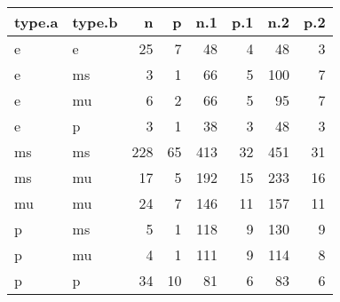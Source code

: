 \captionsetup[table]{labelformat=empty,skip=1pt}
\begin{longtable}{llrrrrrr}
\toprule
type.a & type.b & n & p & n.1 & p.1 & n.2 & p.2 \\ 
\midrule
e & e & 25 & 7 & 48 & 4 & 48 & 3 \\ 
e & ms & 3 & 1 & 66 & 5 & 100 & 7 \\ 
e & mu & 6 & 2 & 66 & 5 & 95 & 7 \\ 
e & p & 3 & 1 & 38 & 3 & 48 & 3 \\ 
ms & ms & 228 & 65 & 413 & 32 & 451 & 31 \\ 
ms & mu & 17 & 5 & 192 & 15 & 233 & 16 \\ 
mu & mu & 24 & 7 & 146 & 11 & 157 & 11 \\ 
p & ms & 5 & 1 & 118 & 9 & 130 & 9 \\ 
p & mu & 4 & 1 & 111 & 9 & 114 & 8 \\ 
p & p & 34 & 10 & 81 & 6 & 83 & 6 \\ 
 \bottomrule
\end{longtable}

